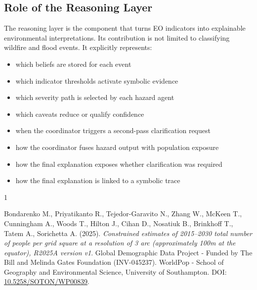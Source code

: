 \documentclass[11pt,a4paper]{article}
\begin{document}
\subsection{Role of the Reasoning Layer}

The reasoning layer is the component that turns EO indicators into explainable environmental interpretations. Its contribution is not limited to classifying wildfire and flood events. It explicitly represents:

\begin{itemize}
\item which beliefs are stored for each event
\item which indicator thresholds activate symbolic evidence
\item which severity path is selected by each hazard agent
\item which caveats reduce or qualify confidence
\item when the coordinator triggers a second-pass clarification request
\item how the coordinator fuses hazard output with population exposure
\item how the final explanation exposes whether clarification was required
\item how the final explanation is linked to a symbolic trace
\end{itemize}

\newpage

\begin{thebibliography}{1}

Bondarenko M., Priyatikanto R., Tejedor-Garavito N., Zhang W., McKeen T., Cunningham A., Woods T., Hilton J., Cihan D., Nosatiuk B., Brinkhoff T., Tatem A., Sorichetta A. (2025).
\emph{Constrained estimates of 2015--2030 total number of people per grid square at a resolution of 3 arc (approximately 100m at the equator), R2025A version v1}.
Global Demographic Data Project - Funded by The Bill and Melinda Gates Foundation (INV-045237).
WorldPop - School of Geography and Environmental Science, University of Southampton.
DOI: \href{https://doi.org/10.5258/SOTON/WP00839}{10.5258/SOTON/WP00839}.

\end{thebibliography}
\end{document}
